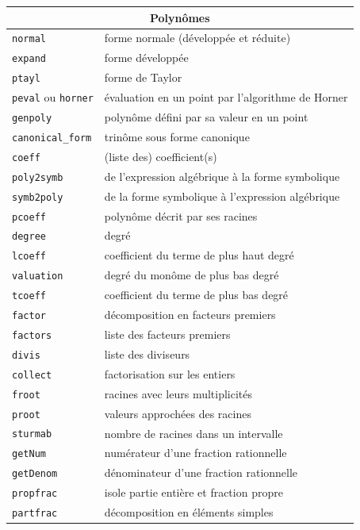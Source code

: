 \documentclass{article}
\begin{document}
\begin{giacjshere}
\begin{center}
\begin{tabular}{|ll|}
\hline
\multicolumn{2}{|c|}{\bf Polyn\^omes}\\
\hline\hline
\verb|normal| &forme normale (d\'evelopp\'ee et r\'eduite)\\
\verb|expand| &forme d\'evelopp\'ee\\
\verb|ptayl| &forme de Taylor\\
\verb|peval| ou \verb|horner| &\'evaluation en un point par l'algorithme de Horner\\
\verb|genpoly| & polyn\^ome d\'efini par sa valeur en un point\\
\verb|canonical_form| & trin\^ome sous forme canonique\\
\hline
\verb|coeff| &(liste des) coefficient(s)\\
\verb|poly2symb| & de l'expression alg\'ebrique \`a la forme symbolique\\
\verb|symb2poly| & de la forme symbolique \`a l'expression alg\'ebrique\\
\verb|pcoeff| &polyn\^ome d\'ecrit par ses racines\\
\hline
\verb|degree| &degr\'e\\
\verb|lcoeff| &coefficient du terme de plus haut degr\'e\\
\verb|valuation| &degr\'e du mon\^ome de plus bas degr\'e\\
\verb|tcoeff| &coefficient du terme de plus bas degr\'e\\
\hline
\verb|factor| & d\'ecomposition en facteurs premiers\\
\verb|factors| & liste des facteurs premiers\\
\verb|divis| & liste des diviseurs\\
\verb|collect| & factorisation sur les entiers\\
\hline
\verb|froot| & racines avec leurs multiplicit\'es\\
\verb|proot| & valeurs approch\'ees des racines\\
\verb|sturmab| & nombre de racines dans un intervalle\\
\hline
\verb|getNum| & num\'erateur d'une fraction rationnelle\\
\verb|getDenom| & d\'enominateur d'une fraction rationnelle\\
\verb|propfrac| & isole partie enti\`ere et fraction propre\\
\verb|partfrac| & d\'ecomposition en \'el\'ements simples\\

\end{tabular}
\end{center}
\end{giacjshere}
\end{document}
